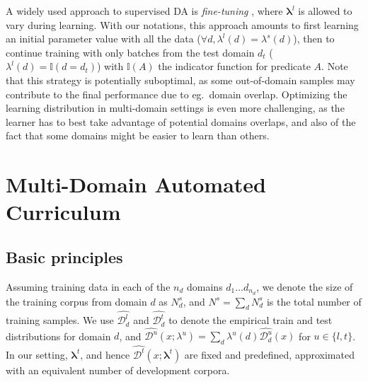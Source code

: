 \documentclass[11pt]{article}
\newcommand{\fyDone}[1]{\done[FY]\Todo[FY:]{\textcolor{orange}{#1}}}
\newcommand{\revision}[1]{\textcolor{red}{#1}}
\newcommand{\system}[1]{\texttt{{#1}}}
\newcommand{\vlambda}{\ensuremath{\boldsymbol\lambda}\xspace} %
\newcommand{\indic}[1]{\ensuremath{\mathbb{I}(#1)}}
\begin{document}
A widely used approach to supervised DA is \emph{fine-tuning} \cite{Luong15stanford,Freitag16fast}, where $\vlambda^{l}$ is allowed to vary during learning. With our notations, this approach amounts to first learning an initial parameter value with all the data ($\forall d, \lambda^{l}(d) = \lambda^{s}(d)$), then to continue training with only batches from the test domain $d_t$ ($\lambda^{l}(d) = \indic{d = d_t}$) with $\indic{A}$ the indicator function for predicate $A$. Note that this strategy is potentially suboptimal, as some out-of-domain samples may contribute to the final performance due to eg.\ domain overlap. Optimizing the learning distribution in multi-domain settings is even more challenging, as the learner has to best take advantage of potential domains overlaps, and also of the fact that some domains might be easier to learn than others.\fyDone{How to measure this?}


\section{Multi-Domain Automated Curriculum } \label{sec:mdac}
\subsection{Basic principles}
Assuming training data in each of the $n_d$ domains $d_1 \dots d_{n_d}$, we denote the size of the training corpus from domain $d$ as $N^{s}_d$, and $N^{s} = \sum_d N^{s}_d$ is the total number of training samples. We use $\widehat{\mathcal{D}^l_d}$ and $\widehat{\mathcal{D}^t _d}$ to denote the empirical train and test distributions for domain $d$, and $\widehat{\mathcal{D}^{u}}(x;\lambda^{u}) = \sum_{d} \lambda^{u}(d) \widehat{\mathcal{D}^{u}_d}(x)$ for $u\in\{l,t\}$. In our setting,  $\vlambda^t$, and hence $\widehat{\mathcal{D}^t}(x;\vlambda^t)$ are fixed and predefined, approximated with an equivalent number of development corpora. 
\end{document}
